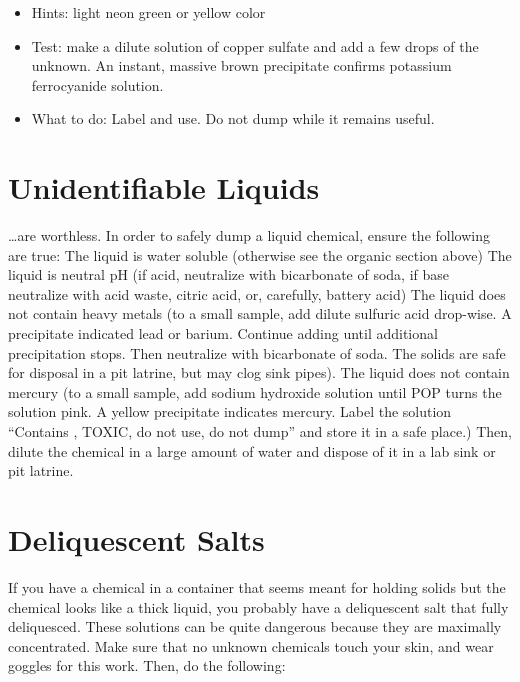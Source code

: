 \begin{itemize}

\item{Hints: light neon green or yellow color}

\item{Test: make a dilute solution of copper sulfate and add a few drops of the unknown. 
An instant, 
massive brown precipitate confirms potassium ferrocyanide solution.}

\item{What to do: Label and use. 
Do not dump while it remains useful.}

\end{itemize}

\section{Unidentifiable Liquids}

\ldots are worthless. 
In order to safely dump a liquid chemical, 
ensure the following are true:
The liquid is water soluble (otherwise see the organic section above)
The liquid is neutral pH (if acid, 
neutralize with bicarbonate of soda, 
if base neutralize with acid waste, 
citric acid, 
or, 
carefully, 
battery acid)
The liquid does not contain heavy metals (to a small sample, 
add dilute sulfuric acid drop-wise. 
A precipitate indicated lead or barium. 
Continue adding until additional precipitation stops. 
Then neutralize with bicarbonate of soda. 
The solids are safe for disposal in a pit latrine, 
but may clog sink pipes).
The liquid does not contain mercury (to a small sample, 
add sodium hydroxide solution until POP turns the solution pink. 
A yellow precipitate indicates mercury. 
Label the solution ``Contains , 
TOXIC, 
do not use, 
do not dump'' and store it in a safe place.)
Then, 
dilute the chemical in a large amount of water 
and dispose of it in a lab sink or pit latrine.

\section{Deliquescent Salts}

If you have a chemical in a container that seems meant 
for holding solids but the chemical looks like a thick liquid, 
you probably have a deliquescent salt that fully deliquesced. 
These solutions can be quite dangerous 
because they are maximally concentrated. 
Make sure that no unknown chemicals touch your skin, 
and wear goggles for this work. 
Then, 
do the following:

